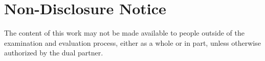\chapter*{Non-Disclosure Notice}

The content of this work may not be made available to people outside of the examination and evaluation process, either as a whole or in part, unless otherwise authorized by the dual partner.

\cleardoublepage
